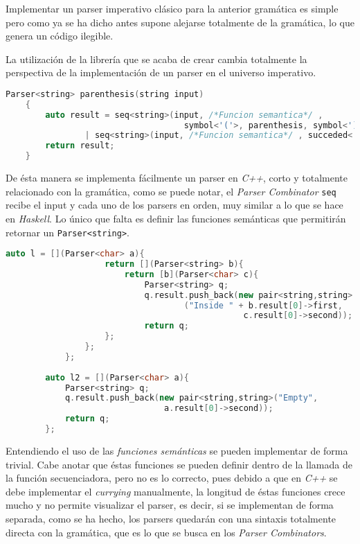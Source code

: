 	Implementar un parser imperativo clásico para la anterior gramática es simple pero como ya se ha dicho antes supone alejarse totalmente de la gramática, lo que genera un código ilegible.

	La utilización de la librería que se acaba de crear cambia totalmente la perspectiva de la implementación de un parser en el universo imperativo.
	
	\begin{lstlisting}[language=C++, caption=utilización de los Parser combinators en C++]
	Parser<string> parenthesis(string input)
	{
		auto result = seq<string>(input, /*Funcion semantica*/ , 
									symbol<'('>, parenthesis, symbol<')'>) 
				| seq<string>(input, /*Funcion semantica*/ , succeded<'e'>);
		return result;
	}		
	\end{lstlisting}
	
	De ésta manera se implementa fácilmente un parser en \emph{C++}, corto y totalmente relacionado con la gramática, como se puede notar, el \emph{Parser Combinator} \texttt{seq} recibe el input y cada uno de los parsers en orden, muy similar a lo que se hace en \emph{Haskell}. Lo único que falta es definir las funciones semánticas que permitirán retornar un \texttt{Parser<string>}. 
	
	\begin{lstlisting}[language=C++, caption=Funciones semánticas en C++]
		auto l = [](Parser<char> a){
					return [](Parser<string> b){
						return [b](Parser<char> c){
							Parser<string> q;
							q.result.push_back(new pair<string,string>
									("Inside " + b.result[0]->first, 
												c.result[0]->second));
							return q;
					};
				};
			};
		
		auto l2 = [](Parser<char> a){
			Parser<string> q;
			q.result.push_back(new pair<string,string>("Empty", 
								a.result[0]->second));
			return q;
		};		
	\end{lstlisting}
	
	Entendiendo el uso de las \emph{funciones semánticas} se pueden implementar de forma trivial. Cabe anotar que éstas funciones se pueden definir dentro de la llamada de la función secuenciadora, pero no es lo correcto, pues debido a que en \emph{C++} se debe implementar el \emph{currying} manualmente, la longitud de éstas funciones crece mucho y no permite visualizar el parser, es decir, si se implementan de forma separada, como se ha hecho, los parsers quedarán con una sintaxis totalmente directa con la gramática, que es lo que se busca en los \emph{Parser Combinators}.
	
